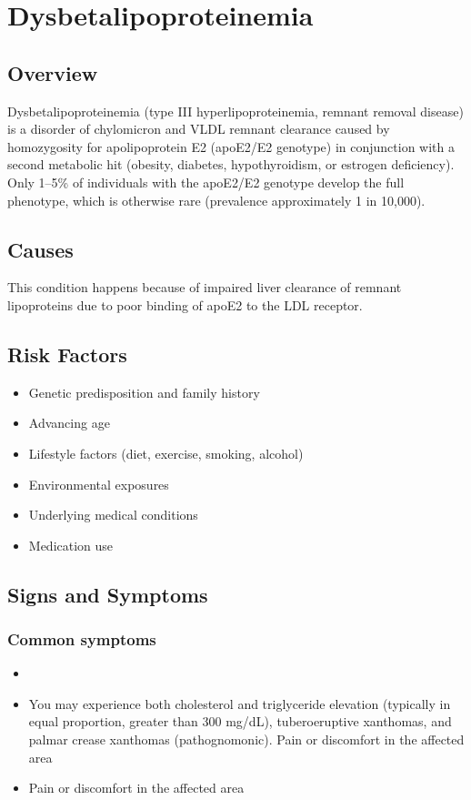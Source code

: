 \chapter{Dysbetalipoproteinemia}
\label{sec:Dysbetalipoproteinemia}

\section{Overview}
Dysbetalipoproteinemia (type III hyperlipoproteinemia, remnant removal disease) is a disorder of chylomicron and VLDL remnant clearance caused by homozygosity for apolipoprotein E2 (apoE2/E2 genotype) in conjunction with a second metabolic hit (obesity, diabetes, hypothyroidism, or estrogen deficiency). Only 1--5\% of individuals with the apoE2/E2 genotype develop the full phenotype, which is otherwise rare (prevalence approximately 1 in 10,000).
\section{Causes}
This condition happens because of impaired liver clearance of remnant lipoproteins due to poor binding of apoE2 to the LDL receptor.     
\section{Risk Factors}

\begin{itemize}[noitemsep]
  \item Genetic predisposition and family history
  \item Advancing age
  \item Lifestyle factors (diet, exercise, smoking, alcohol)
  \item Environmental exposures
  \item Underlying medical conditions
  \item Medication use
\end{itemize}
\section{Signs and Symptoms}

\subsection{Common symptoms}
\begin{itemize}[noitemsep]
  \item \item You may experience both cholesterol and triglyceride elevation (typically in equal proportion, greater than 300 mg/dL), tuberoeruptive xanthomas, and palmar crease xanthomas (pathognomonic). Pain or discomfort in the affected area    \item Pain or discomfort in the affected area
  \end{itemize}

